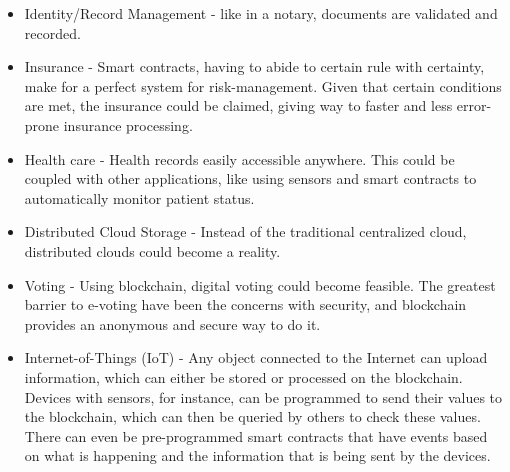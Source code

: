     \begin{itemize}
     \item Identity/Record Management - like in a notary, documents are validated and recorded.
     
     \item Insurance - Smart contracts, having to abide to certain rule with certainty, make for a perfect system for risk-management. Given that certain conditions are met, the insurance could be claimed, giving way to faster and less error-prone insurance processing.
     
     \item Health care - Health records easily accessible anywhere. This could be coupled with other applications, like using sensors and smart contracts to automatically monitor patient status.
     
     \item Distributed Cloud Storage - Instead of the traditional centralized cloud, distributed clouds could become a reality.
     
     \item Voting - Using blockchain, digital voting could become feasible. The greatest barrier to e-voting have been the concerns with security, and blockchain provides an anonymous and secure way to do it.
     
     \item Internet-of-Things (IoT) - Any object connected to the Internet can upload information, which can either be stored or processed on the blockchain. Devices with sensors, for instance, can be programmed to send their values to the blockchain, which can then be queried by others to check these values. There can even be pre-programmed smart contracts that have events based on what is happening and the information that is being sent by the devices.
	\end{itemize}
